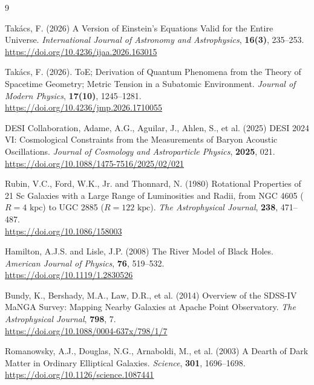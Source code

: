 \documentclass[11pt,a4paper]{article}
\begin{document}
\begin{thebibliography}{9}
	
	Tak\'acs, F. (2026) A Version of Einstein's Equations Valid for the Entire Universe. \textit{International Journal of Astronomy and Astrophysics}, \textbf{16(3)}, 235--253. \\
	\url{https://doi.org/10.4236/ijaa.2026.163015}
	
	Tak\'acs, F. (2026). ToE; Derivation of Quantum Phenomena from the Theory of Spacetime Geometry; Metric Tension in a Subatomic Environment.
	\textit{Journal of Modern Physics}, \textbf{17(10)}, 1245–1281.\\ \url{https://doi.org/10.4236/jmp.2026.1710055}

	DESI Collaboration, Adame, A.G., Aguilar, J., Ahlen, S., et al. (2025) DESI 2024 VI: Cosmological Constraints from the Measurements of Baryon Acoustic Oscillations. \textit{Journal of Cosmology and Astroparticle Physics}, \textbf{2025}, 021. \\
	\url{https://doi.org/10.1088/1475-7516/2025/02/021}
	
	Rubin, V.C., Ford, W.K., Jr. and Thonnard, N. (1980) Rotational Properties of 21 Sc Galaxies with a Large Range of Luminosities and Radii, from NGC 4605 ($R = 4\text{ kpc}$) to UGC 2885 ($R = 122\text{ kpc}$). \textit{The Astrophysical Journal}, \textbf{238}, 471--487. \\
	\url{https://doi.org/10.1086/158003}
	
	Hamilton, A.J.S. and Lisle, J.P. (2008) The River Model of Black Holes. \textit{American Journal of Physics}, \textbf{76}, 519--532. \\
	\url{https://doi.org/10.1119/1.2830526}
	
	Bundy, K., Bershady, M.A., Law, D.R., et al. (2014) Overview of the SDSS-IV MaNGA Survey: Mapping Nearby Galaxies at Apache Point Observatory. \textit{The Astrophysical Journal}, \textbf{798}, 7. \\
	\url{https://doi.org/10.1088/0004-637x/798/1/7}
	
	Romanowsky, A.J., Douglas, N.G., Arnaboldi, M., et al. (2003) A Dearth of Dark Matter in Ordinary Elliptical Galaxies. \textit{Science}, \textbf{301}, 1696--1698. \\
	\url{https://doi.org/10.1126/science.1087441}
	
\end{thebibliography}
\end{document}
